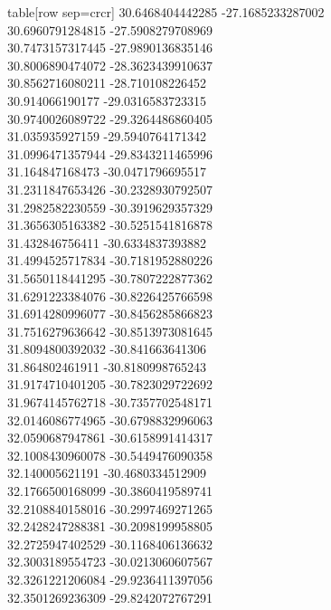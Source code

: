   table[row sep=crcr]{%
30.6468404442285	-27.1685233287002\\
30.6960791284815	-27.5908279708969\\
30.7473157317445	-27.9890136835146\\
30.8006890474072	-28.3623439910637\\
30.8562716080211	-28.710108226452\\
30.914066190177	-29.0316583723315\\
30.9740026089722	-29.3264486860405\\
31.035935927159	-29.5940764171342\\
31.0996471357944	-29.8343211465996\\
31.164847168473	-30.0471796695517\\
31.2311847653426	-30.2328930792507\\
31.2982582230559	-30.3919629357329\\
31.3656305163382	-30.5251541816878\\
31.432846756411	-30.6334837393882\\
31.4994525717834	-30.7181952880226\\
31.5650118441295	-30.7807222877362\\
31.6291223384076	-30.8226425766598\\
31.6914280996077	-30.8456285866823\\
31.7516279636642	-30.8513973081645\\
31.8094800392032	-30.841663641306\\
31.864802461911	-30.8180998765243\\
31.9174710401205	-30.7823029722692\\
31.9674145762718	-30.7357702548171\\
32.0146086774965	-30.6798832996063\\
32.0590687947861	-30.6158991414317\\
32.1008430960078	-30.5449476090358\\
32.140005621191	-30.4680334512909\\
32.1766500168099	-30.3860419589741\\
32.2108840158016	-30.2997469271265\\
32.2428247288381	-30.2098199958805\\
32.2725947402529	-30.1168406136632\\
32.3003189554723	-30.0213060607567\\
32.3261221206084	-29.9236411397056\\
32.3501269236309	-29.8242072767291\\
}
